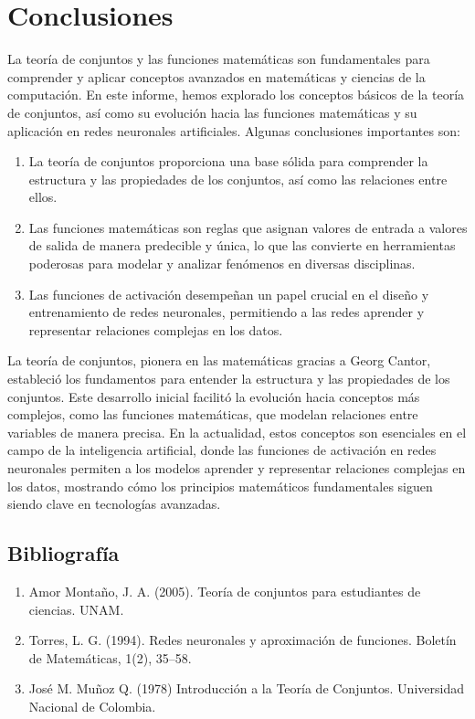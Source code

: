 \documentclass[11pt, a4paper]{article}
\begin{document}
\newpage

\section{Conclusiones}
La teoría de conjuntos y las funciones matemáticas son fundamentales para comprender y aplicar conceptos avanzados en matemáticas y ciencias de la computación. En este informe, hemos explorado los conceptos básicos de la teoría de conjuntos, así como su evolución hacia las funciones matemáticas y su aplicación en redes neuronales artificiales. Algunas conclusiones importantes son:
\begin{enumerate}
  \item La teoría de conjuntos proporciona una base sólida para comprender la estructura y las propiedades de los conjuntos, así como las relaciones entre ellos.
  \item Las funciones matemáticas son reglas que asignan valores de entrada a valores de salida de manera predecible y única, lo que las convierte en herramientas poderosas para modelar y analizar fenómenos en diversas disciplinas.
  \item Las funciones de activación desempeñan un papel crucial en el diseño y entrenamiento de redes neuronales, permitiendo a las redes aprender y representar relaciones complejas en los datos.
\end{enumerate}
La teoría de conjuntos, pionera en las matemáticas gracias a Georg Cantor, estableció los fundamentos para entender la estructura y las propiedades de los conjuntos. Este desarrollo inicial facilitó la evolución hacia conceptos más complejos, como las funciones matemáticas, que modelan relaciones entre variables de manera precisa. En la actualidad, estos conceptos son esenciales en el campo de la inteligencia artificial, donde las funciones de activación en redes neuronales permiten a los modelos aprender y representar relaciones complejas en los datos, mostrando cómo los principios matemáticos fundamentales siguen siendo clave en tecnologías avanzadas.

\subsection{Bibliografía}

\begin{enumerate}
  \item Amor Montaño, J. A. (2005). Teoría de conjuntos para estudiantes de ciencias. UNAM.
  \item Torres, L. G. (1994). Redes neuronales y aproximación de funciones. Boletín de Matemáticas, 1(2), 35–58.
  \item José M. Muñoz Q. (1978) Introducción a la Teoría de Conjuntos. Universidad Nacional de Colombia.
\end{enumerate}
\end{document}

